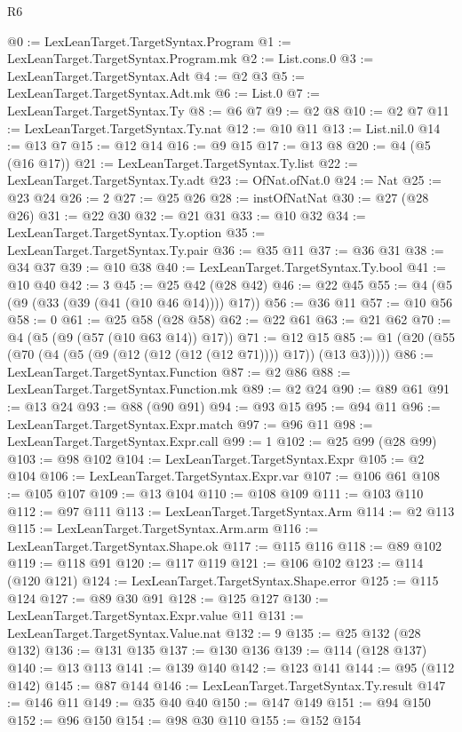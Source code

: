 \begin{lexlean}{R6}
\begin{coremodule}
{{{{{{{{{{{{{{{{{{{{{{{{{{{{{{{{{{{{{{{{{{{{{{{{{{{{{{{{{{{{{@0 := LexLeanTarget.TargetSyntax.Program
@1 := LexLeanTarget.TargetSyntax.Program.mk
@2 := List.cons.{0}
@3 := LexLeanTarget.TargetSyntax.Adt
@4 := @2 @3
@5 := LexLeanTarget.TargetSyntax.Adt.mk
@6 := List.{0}
@7 := LexLeanTarget.TargetSyntax.Ty
@8 := @6 @7
@9 := @2 @8
@10 := @2 @7
@11 := LexLeanTarget.TargetSyntax.Ty.nat
@12 := @10 @11
@13 := List.nil.{0}
@14 := @13 @7
@15 := @12 @14
@16 := @9 @15
@17 := @13 @8
@20 := @4 (@5 (@16 @17))
@21 := LexLeanTarget.TargetSyntax.Ty.list
@22 := LexLeanTarget.TargetSyntax.Ty.adt
@23 := OfNat.ofNat.{0}
@24 := Nat
@25 := @23 @24
@26 := 2
@27 := @25 @26
@28 := instOfNatNat
@30 := @27 (@28 @26)
@31 := @22 @30
@32 := @21 @31
@33 := @10 @32
@34 := LexLeanTarget.TargetSyntax.Ty.option
@35 := LexLeanTarget.TargetSyntax.Ty.pair
@36 := @35 @11
@37 := @36 @31
@38 := @34 @37
@39 := @10 @38
@40 := LexLeanTarget.TargetSyntax.Ty.bool
@41 := @10 @40
@42 := 3
@45 := @25 @42 (@28 @42)
@46 := @22 @45
@55 := @4 (@5 (@9 (@33 (@39 (@41 (@10 @46 @14)))) @17))
@56 := @36 @11
@57 := @10 @56
@58 := 0
@61 := @25 @58 (@28 @58)
@62 := @22 @61
@63 := @21 @62
@70 := @4 (@5 (@9 (@57 (@10 @63 @14)) @17))
@71 := @12 @15
@85 := @1 (@20 (@55 (@70 (@4 (@5 (@9 (@12 (@12 (@12 (@12 @71)))) @17)) (@13 @3)))))
@86 := LexLeanTarget.TargetSyntax.Function
@87 := @2 @86
@88 := LexLeanTarget.TargetSyntax.Function.mk
@89 := @2 @24
@90 := @89 @61
@91 := @13 @24
@93 := @88 (@90 @91)
@94 := @93 @15
@95 := @94 @11
@96 := LexLeanTarget.TargetSyntax.Expr.match
@97 := @96 @11
@98 := LexLeanTarget.TargetSyntax.Expr.call
@99 := 1
@102 := @25 @99 (@28 @99)
@103 := @98 @102
@104 := LexLeanTarget.TargetSyntax.Expr
@105 := @2 @104
@106 := LexLeanTarget.TargetSyntax.Expr.var
@107 := @106 @61
@108 := @105 @107
@109 := @13 @104
@110 := @108 @109
@111 := @103 @110
@112 := @97 @111
@113 := LexLeanTarget.TargetSyntax.Arm
@114 := @2 @113
@115 := LexLeanTarget.TargetSyntax.Arm.arm
@116 := LexLeanTarget.TargetSyntax.Shape.ok
@117 := @115 @116
@118 := @89 @102
@119 := @118 @91
@120 := @117 @119
@121 := @106 @102
@123 := @114 (@120 @121)
@124 := LexLeanTarget.TargetSyntax.Shape.error
@125 := @115 @124
@127 := @89 @30 @91
@128 := @125 @127
@130 := LexLeanTarget.TargetSyntax.Expr.value @11
@131 := LexLeanTarget.TargetSyntax.Value.nat
@132 := 9
@135 := @25 @132 (@28 @132)
@136 := @131 @135
@137 := @130 @136
@139 := @114 (@128 @137)
@140 := @13 @113
@141 := @139 @140
@142 := @123 @141
@144 := @95 (@112 @142)
@145 := @87 @144
@146 := LexLeanTarget.TargetSyntax.Ty.result
@147 := @146 @11
@149 := @35 @40 @40
@150 := @147 @149
@151 := @94 @150
@152 := @96 @150
@154 := @98 @30 @110
@155 := @152 @154
}}}}}}}}}}}}}}}}}}}}}}}}}}}}}}}}}}}}}}}}}}}}}}}}}}}}}}}}}}}}}
\end{coremodule}
\end{lexlean}
